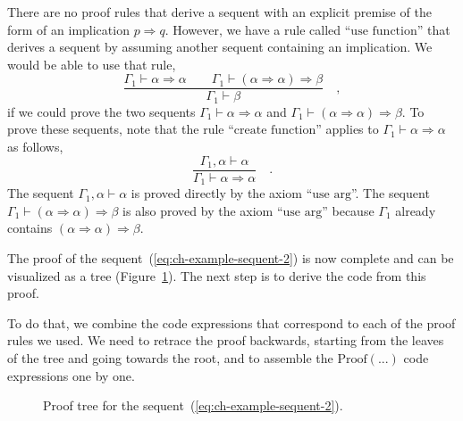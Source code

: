 There are no proof rules that derive a sequent with an explicit premise
of the form of an implication $p\Rightarrow q$. However, we have
a rule called ``$\text{use function}$'' that derives a sequent
by assuming another sequent containing an implication. We would be
able to use that rule,
\[
\frac{\Gamma_{1}\vdash\alpha\Rightarrow\alpha\quad\quad\Gamma_{1}\vdash(\alpha\Rightarrow\alpha)\Rightarrow\beta}{\Gamma_{1}\vdash\beta}\quad,
\]
if we could prove the two sequents $\Gamma_{1}\vdash\alpha\Rightarrow\alpha$
and $\Gamma_{1}\vdash(\alpha\Rightarrow\alpha)\Rightarrow\beta$.
To prove these sequents, note that the rule ``$\text{create function}$''
applies to $\Gamma_{1}\vdash\alpha\Rightarrow\alpha$ as follows,
\[
\frac{\Gamma_{1},\alpha\vdash\alpha}{\Gamma_{1}\vdash\alpha\Rightarrow\alpha}\quad.
\]
The sequent $\Gamma_{1},\alpha\vdash\alpha$ is proved directly by
the axiom ``$\text{use arg}$''. The sequent $\Gamma_{1}\vdash(\alpha\Rightarrow\alpha)\Rightarrow\beta$
is also proved by the axiom ``$\text{use arg}$'' because $\Gamma_{1}$
already contains $(\alpha\Rightarrow\alpha)\Rightarrow\beta$.

The proof of the sequent~(\ref{eq:ch-example-sequent-2}) is now
complete and can be visualized as a tree (Figure~\ref{fig:Proof-of-the-sequent-example-2}).
The next step is to derive the code from this proof. 

To do that, we combine the code expressions that correspond to each
of the proof rules we used. We need to retrace the proof backwards,
starting from the leaves of the tree and going towards the root, and
to assemble the $\text{Proof}\left(...\right)$ code expressions one
by one.

\begin{figure}
\begin{centering}
{\footnotesize{}}%
\par\end{centering}
\caption{Proof tree for the sequent~(\ref{eq:ch-example-sequent-2}).\label{fig:Proof-of-the-sequent-example-2}}
\end{figure}

